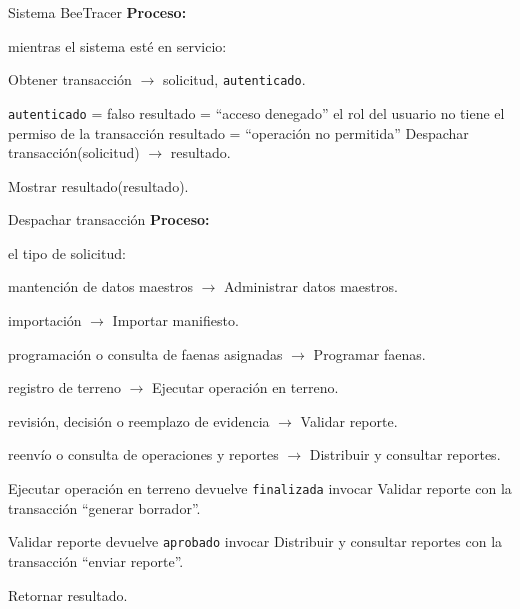 \begin{modspec}{Sistema BeeTracer}
\textbf{Proceso:}
\begin{logica}
    \item {} mientras el sistema esté en servicio:
    \begin{logica}
        \item Obtener transacción $\rightarrow$ solicitud, \texttt{autenticado}.
        \item {} \texttt{autenticado} = falso  resultado = ``acceso
        denegado''  el rol del usuario no tiene el permiso de la transacción
         resultado = ``operación no permitida''  Despachar
        transacción(solicitud) $\rightarrow$ resultado.
        \item Mostrar resultado(resultado).
    \end{logica}
\end{logica}
\end{modspec}

\begin{modspec}{Despachar transacción}
\textbf{Proceso:}
\begin{logica}
    \item {} el tipo de solicitud:
    \begin{logica}
        \item mantención de datos maestros $\rightarrow$ Administrar datos maestros.
        \item importación $\rightarrow$ Importar manifiesto.
        \item programación o consulta de faenas asignadas $\rightarrow$ Programar faenas.
        \item registro de terreno $\rightarrow$ Ejecutar operación en terreno.
        \item revisión, decisión o reemplazo de evidencia $\rightarrow$ Validar reporte.
        \item reenvío o consulta de operaciones y reportes $\rightarrow$ Distribuir y
        consultar reportes.
    \end{logica}
    \item {} Ejecutar operación en terreno devuelve \texttt{finalizada} 
    invocar Validar reporte con la transacción ``generar borrador''.
    \item {} Validar reporte devuelve \texttt{aprobado}  invocar
    Distribuir y consultar reportes con la transacción ``enviar reporte''.
    \item Retornar resultado.
\end{logica}
\end{modspec}

